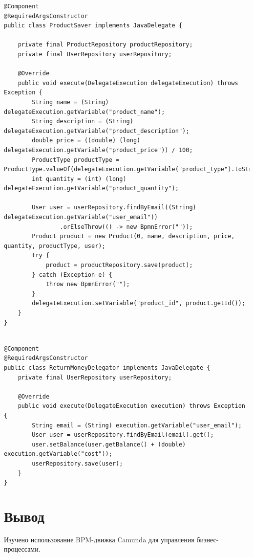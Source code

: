 \documentclass{article}
\begin{document}
\begin{lstlisting}
@Component
@RequiredArgsConstructor
public class ProductSaver implements JavaDelegate {

    private final ProductRepository productRepository;
    private final UserRepository userRepository;

    @Override
    public void execute(DelegateExecution delegateExecution) throws Exception {
        String name = (String) delegateExecution.getVariable("product_name");
        String description = (String) delegateExecution.getVariable("product_description");
        double price = ((double) (long) delegateExecution.getVariable("product_price")) / 100;
        ProductType productType = ProductType.valueOf(delegateExecution.getVariable("product_type").toString());
        int quantity = (int) (long) delegateExecution.getVariable("product_quantity");

        User user = userRepository.findByEmail((String) delegateExecution.getVariable("user_email"))
                .orElseThrow(() -> new BpmnError(""));
        Product product = new Product(0, name, description, price, quantity, productType, user);
        try {
            product = productRepository.save(product);
        } catch (Exception e) {
            throw new BpmnError("");
        }
        delegateExecution.setVariable("product_id", product.getId());
    }
}
\end{lstlisting}

\begin{lstlisting}  

@Component
@RequiredArgsConstructor
public class ReturnMoneyDelegator implements JavaDelegate { 
    private final UserRepository userRepository;

    @Override
    public void execute(DelegateExecution execution) throws Exception {
        String email = (String) execution.getVariable("user_email");
        User user = userRepository.findByEmail(email).get();
        user.setBalance(user.getBalance() + (double) execution.getVariable("cost"));
        userRepository.save(user);
    }
}
\end{lstlisting}

\section*{Вывод}

Изучено использование BPM-движка Camunda для управления бизнес-процессами.
\end{document}
